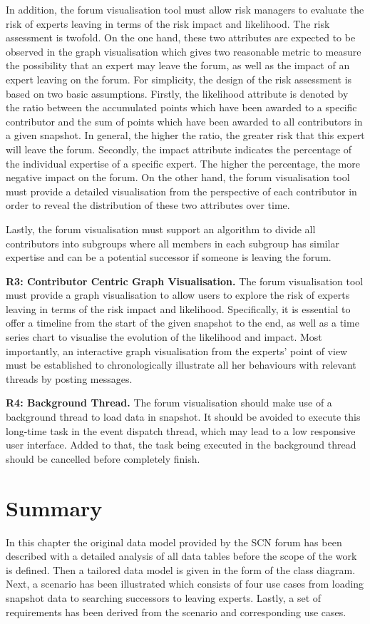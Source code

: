 In addition, the forum visualisation tool must allow risk managers to evaluate the risk of experts leaving in terms of the risk impact and likelihood. The risk assessment is twofold. On the one hand, these two attributes are expected to be observed in the graph visualisation which gives two reasonable metric to measure the possibility that an expert may leave the forum, as well as the impact of an expert leaving on the forum. For simplicity, the design of the risk assessment is based on two basic assumptions. Firstly, the likelihood attribute is denoted by the ratio between the accumulated points which have been awarded to a specific contributor and the sum of points which have been awarded to all contributors in a given snapshot. In general, the higher the ratio, the greater risk that this expert will leave the forum. Secondly, the impact attribute indicates the percentage of the individual expertise of a specific expert. The higher the percentage, the more negative impact on the forum. On the other hand, the forum visualisation tool must provide a detailed visualisation from the perspective of each contributor in order to reveal the distribution of these two attributes over time.

Lastly, the forum visualisation must support an algorithm to divide all contributors into subgroups where all members in each subgroup has similar expertise and can be a potential successor if someone is leaving the forum.

\textbf{R3: Contributor Centric Graph Visualisation.}
The forum visualisation tool must provide a graph visualisation to allow users to explore the risk of experts leaving in terms of the risk impact and likelihood. Specifically, it is essential to offer a timeline from the start of the given snapshot to the end, as well as a time series chart to visualise the evolution of the likelihood and impact. Most importantly, an interactive graph visualisation from the experts' point of view must be established to chronologically illustrate all her behaviours with relevant threads by posting messages.

\textbf{R4: Background Thread.}
The forum visualisation should make use of a background thread to load data in snapshot. It should be avoided to execute this long-time task in the event dispatch thread, which may lead to a low responsive user interface. Added to that, the task being executed in the background thread should be cancelled before completely finish.

\section{Summary}
In this chapter the original data model provided by the SCN forum has been described with a detailed analysis of all data tables before the scope of the work is defined. Then a tailored data model is given in the form of the class diagram. Next, a scenario has been illustrated which consists of four use cases from loading snapshot data to searching successors to leaving experts. Lastly, a set of requirements has been derived from the scenario and corresponding use cases. 
